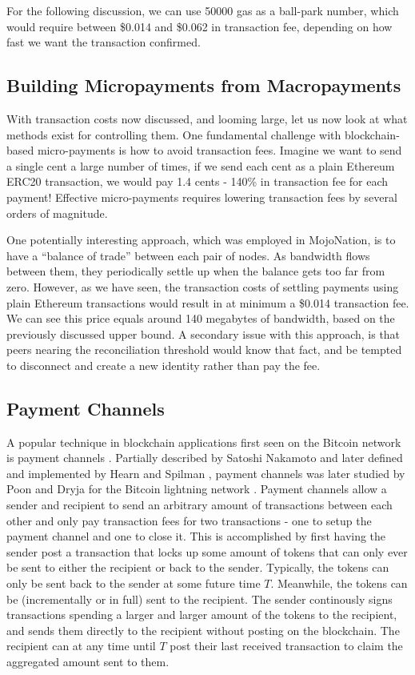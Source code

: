 For the following discussion, we can use 50000 gas as a ball-park number, which would require between \$0.014 and \$0.062 in transaction fee, depending on how fast we want the transaction confirmed.

\subsection{Building Micropayments from Macropayments}

With transaction costs now discussed, and looming large, let us now look at what methods exist for controlling them. One fundamental challenge with blockchain-based micro-payments is how to avoid transaction fees. Imagine we want to send a single cent a large number of times, if we send each cent as a plain Ethereum ERC20 transaction, we would pay 1.4 cents - 140\% in transaction fee for each payment! Effective micro-payments requires lowering transaction fees by several orders of magnitude.

One potentially interesting approach, which was employed in MojoNation\cite{mojonation}, is to have a ``balance of trade'' between each pair of nodes. As bandwidth flows between them, they periodically settle up when the balance gets too far from zero. However, as we have seen, the transaction costs of settling payments using plain Ethereum transactions would result in at minimum a \$0.014 transaction fee. We can see this price equals around 140 megabytes of bandwidth, based on the previously discussed upper bound. A secondary issue with this approach, is that peers nearing the reconciliation threshold would know that fact, and be tempted to disconnect and create a new identity rather than pay the fee.

\subsection{Payment Channels}

A popular technique in blockchain applications first seen on the Bitcoin network is payment channels \cite{PaymentChannels}. Partially described by Satoshi Nakamoto \cite{Satoshi} and later defined and implemented by Hearn and Spilman \cite{BitcoinWikiContracts}, payment channels was later studied by Poon and Dryja for the Bitcoin lightning network \cite{PoonDryja}. Payment channels allow a sender and recipient to send an arbitrary amount of transactions between each other and only pay transaction fees for two transactions - one to setup the payment channel and one to close it. This is accomplished by first having the sender post a transaction that locks up some amount of tokens that can only ever be sent to either the recipient or back to the sender. Typically, the tokens can only be sent back to the sender at some future time $T$. Meanwhile, the tokens can be (incrementally or in full) sent to the recipient. The sender continously signs transactions spending a larger and larger amount of the tokens to the recipient, and sends them directly to the recipient without posting on the blockchain. The recipient can at any time until $T$ post their last received transaction to claim the aggregated amount sent to them.

